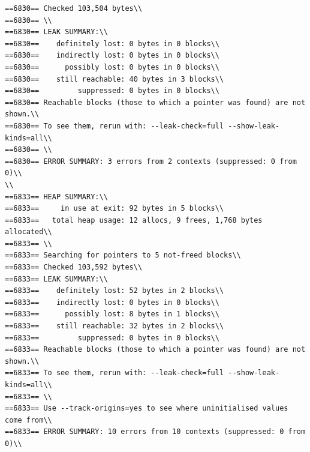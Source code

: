 \documentclass[a4paper,12pt]{report}
\begin{document}
\begin{verbatim}
==6830== Checked 103,504 bytes\\
==6830== \\
==6830== LEAK SUMMARY:\\
==6830==    definitely lost: 0 bytes in 0 blocks\\
==6830==    indirectly lost: 0 bytes in 0 blocks\\
==6830==      possibly lost: 0 bytes in 0 blocks\\
==6830==    still reachable: 40 bytes in 3 blocks\\
==6830==         suppressed: 0 bytes in 0 blocks\\
==6830== Reachable blocks (those to which a pointer was found) are not shown.\\
==6830== To see them, rerun with: --leak-check=full --show-leak-kinds=all\\
==6830== \\
==6830== ERROR SUMMARY: 3 errors from 2 contexts (suppressed: 0 from 0)\\
\\
==6833== HEAP SUMMARY:\\
==6833==     in use at exit: 92 bytes in 5 blocks\\
==6833==   total heap usage: 12 allocs, 9 frees, 1,768 bytes allocated\\
==6833== \\
==6833== Searching for pointers to 5 not-freed blocks\\
==6833== Checked 103,592 bytes\\
==6833== LEAK SUMMARY:\\
==6833==    definitely lost: 52 bytes in 2 blocks\\
==6833==    indirectly lost: 0 bytes in 0 blocks\\
==6833==      possibly lost: 8 bytes in 1 blocks\\
==6833==    still reachable: 32 bytes in 2 blocks\\
==6833==         suppressed: 0 bytes in 0 blocks\\
==6833== Reachable blocks (those to which a pointer was found) are not shown.\\
==6833== To see them, rerun with: --leak-check=full --show-leak-kinds=all\\
==6833== \\
==6833== Use --track-origins=yes to see where uninitialised values come from\\
==6833== ERROR SUMMARY: 10 errors from 10 contexts (suppressed: 0 from 0)\\

\end{verbatim}
\end{document}
